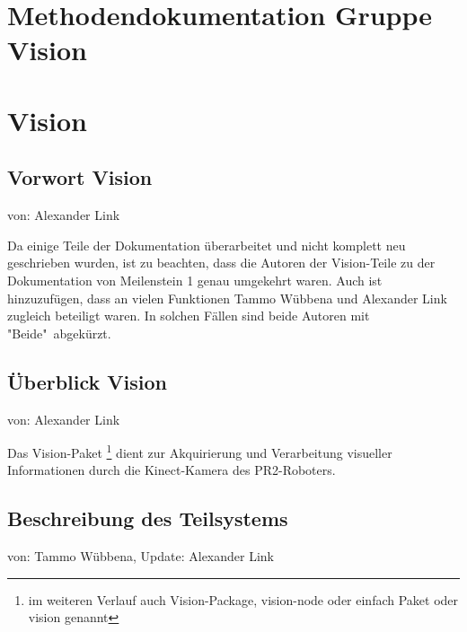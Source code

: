 \documentclass{suturo}
\makeatletter
\newcommand{\chapterauthor}[1]{%
  {\parindent0pt\vspace*{-27pt}%
  \linespread{0}\small\begin{flushright}von: #1\end{flushright}%
  \par\nobreak\vspace*{0pt}}
  \@afterheading%
}
\makeatother
\begin{document}
\newpage

\section*{Methodendokumentation Gruppe Vision}

\section{Vision}
\subsection{Vorwort Vision}
\chapterauthor{Alexander Link}
Da einige Teile der Dokumentation überarbeitet und nicht komplett neu geschrieben wurden, ist zu beachten, dass die Autoren der Vision-Teile zu der Dokumentation von Meilenstein 1 genau umgekehrt waren. Auch ist hinzuzufügen, dass an vielen Funktionen Tammo Wübbena und Alexander Link zugleich beteiligt waren. In solchen Fällen sind beide Autoren mit "Beide"\ abgekürzt.

\subsection{Überblick Vision}
\chapterauthor{Alexander Link}
Das Vision-Paket \footnote{im weiteren Verlauf auch Vision-Package, vision-node oder einfach Paket oder vision genannt} dient zur Akquirierung und Verarbeitung visueller Informationen durch die Kinect-Kamera des PR2-Roboters.

\begin{figure}[!htb]
\end{figure}
      
\subsection{Beschreibung des Teilsystems}
\chapterauthor{Tammo Wübbena, Update: Alexander Link}
\end{document}

